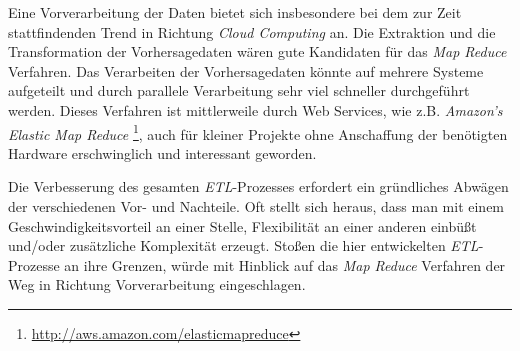 Eine Vorverarbeitung der Daten bietet sich insbesondere bei dem zur
Zeit stattfindenden Trend in Richtung \textit{Cloud Computing} an. Die
Extraktion und die Transformation der Vorhersagedaten wären gute
Kandidaten für das \textit{Map Reduce} Verfahren. Das Verarbeiten der
Vorhersagedaten könnte auf mehrere Systeme aufgeteilt und durch
parallele Verarbeitung sehr viel schneller durchgeführt werden.
Dieses Verfahren ist mittlerweile durch Web Services, wie
z.B. \textit{Amazon's Elastic Map Reduce}
\footnote{\url{http://aws.amazon.com/elasticmapreduce}}, auch für
kleiner Projekte ohne Anschaffung der benötigten Hardware
erschwinglich und interessant geworden.

Die Verbesserung des gesamten \textit{ETL}-Prozesses erfordert ein
gründliches Abwägen der verschiedenen Vor- und Nachteile. Oft stellt
sich heraus, dass man mit einem Geschwindigkeitsvorteil an einer
Stelle, Flexibilität an einer anderen einbüßt und/oder zusätzliche
Komplexität erzeugt. Stoßen die hier entwickelten
\textit{ETL}-Prozesse an ihre Grenzen, würde mit Hinblick auf das
\textit{Map Reduce} Verfahren der Weg in Richtung Vorverarbeitung
eingeschlagen.


